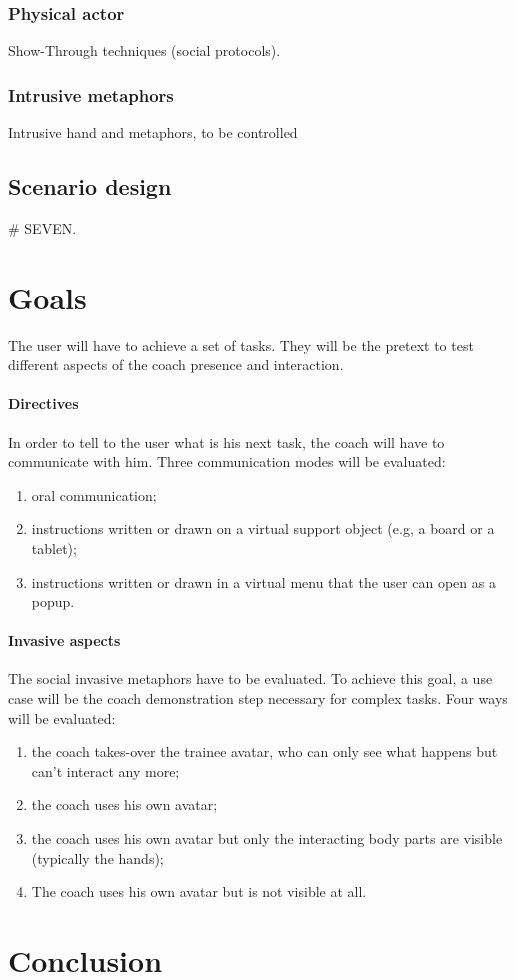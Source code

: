\documentclass[a4paper]{article}
\begin{document}

\subsubsection{Physical actor}
Show-Through techniques (social protocols).

\subsubsection{Intrusive metaphors}
Intrusive hand and metaphors, to be controlled

\subsection{Scenario design}
\# SEVEN.

\section{Goals}

The user will have to achieve a set of tasks. They will be the pretext to test different aspects of the coach presence and interaction.

\paragraph{Directives} In order to tell to the user what is his next task, the coach will have to communicate with him. Three communication modes will be evaluated:
\begin{enumerate}
	\item oral communication;
	\item instructions written or drawn on a virtual support object (e.g, a board or a tablet);
	\item instructions written or drawn in a virtual menu that the user can open as a popup.
\end{enumerate}

\paragraph{Invasive aspects} The social invasive metaphors have to be evaluated. To achieve this goal, a use case will be the coach demonstration step necessary for complex tasks. Four ways will be evaluated:
\begin{enumerate}
	\item the coach takes-over the trainee avatar, who can only see what happens but can't interact any more;
	\item the coach uses his own avatar;
	\item the coach uses his own avatar but only the interacting body parts are visible (typically the hands);
	\item The coach uses his own avatar but is not visible at all.
\end{enumerate}



\section{Conclusion}
\end{document}
